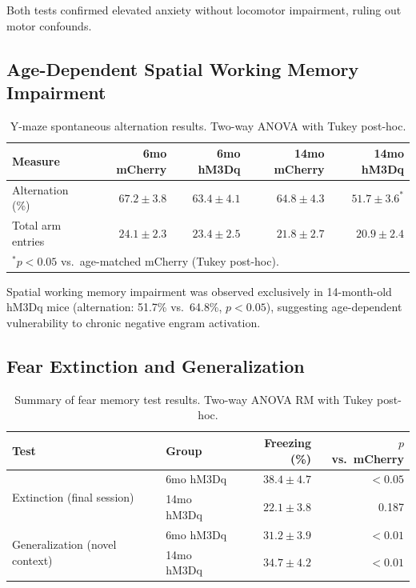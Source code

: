 \documentclass[11pt]{article}
\begin{document}
Both tests confirmed elevated anxiety without locomotor impairment, ruling out motor confounds.

\subsection{Age-Dependent Spatial Working Memory Impairment}

\begin{table}[H]
\centering
\caption{Y-maze spontaneous alternation results. Two-way ANOVA with Tukey post-hoc.}
\label{tab:ymaze}
\begin{tabular}{lrrrr}
\toprule
\textbf{Measure} & \textbf{6mo mCherry} & \textbf{6mo hM3Dq} & \textbf{14mo mCherry} & \textbf{14mo hM3Dq} \\
\midrule
Alternation (\%) & $67.2 \pm 3.8$ & $63.4 \pm 4.1$ & $64.8 \pm 4.3$ & $51.7 \pm 3.6^{*}$ \\
Total arm entries & $24.1 \pm 2.3$ & $23.4 \pm 2.5$ & $21.8 \pm 2.7$ & $20.9 \pm 2.4$ \\
\bottomrule
\multicolumn{5}{l}{\footnotesize $^{*}p < 0.05$ vs.\ age-matched mCherry (Tukey post-hoc).}
\end{tabular}
\end{table}

Spatial working memory impairment was observed exclusively in 14-month-old hM3Dq mice (alternation: 51.7\% vs.\ 64.8\%, $p < 0.05$), suggesting age-dependent vulnerability to chronic negative engram activation.

\subsection{Fear Extinction and Generalization}

\begin{table}[H]
\centering
\caption{Summary of fear memory test results. Two-way ANOVA RM with Tukey post-hoc.}
\label{tab:fear}
\begin{tabular}{llrr}
\toprule
\textbf{Test} & \textbf{Group} & \textbf{Freezing (\%)} & \textbf{$p$ vs.\ mCherry} \\
\midrule
\multirow{2}{*}{Extinction (final session)} & 6mo hM3Dq & $38.4 \pm 4.7$ & $<0.05$ \\
 & 14mo hM3Dq & $22.1 \pm 3.8$ & 0.187 \\
\midrule
\multirow{2}{*}{Generalization (novel context)} & 6mo hM3Dq & $31.2 \pm 3.9$ & $<0.01$ \\
 & 14mo hM3Dq & $34.7 \pm 4.2$ & $<0.01$ \\
\bottomrule
\end{tabular}
\end{table}
\end{document}
